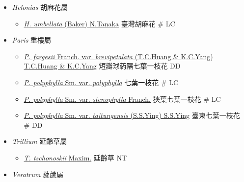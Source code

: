 
  \begin{itemize}
 \item[] \textit{Helonias} 胡麻花屬
                                
  \begin{itemize}
        \item[] \href{http://www.theplantlist.org/tpl1.1/search?q=Helonias+umbellata}{\textit{H. umbellata} (Baker) N.Tanaka}   臺灣胡麻花  \# LC
  \end{itemize}
 \item[] \textit{Paris} 重樓屬
                                
  \begin{itemize}
        \item[] \href{http://www.theplantlist.org/tpl1.1/search?q=Paris+fargesii+var.+brevipetalata}{\textit{P. fargesii} Franch. var. \textit{brevipetalata} (T.C.Huang \& K.C.Yang) T.C.Huang \& K.C.Yang}   短瓣球葯隔七葉一枝花   DD
        \item[] \href{http://www.theplantlist.org/tpl1.1/search?q=Paris+polyphylla+var.+polyphylla}{\textit{P. polyphylla} Sm. var. \textit{polyphylla}}   七葉一枝花  \# LC
        \item[] \href{http://www.theplantlist.org/tpl1.1/search?q=Paris+polyphylla+var.+stenophylla}{\textit{P. polyphylla} Sm. var. \textit{stenophylla} Franch.}   狹葉七葉一枝花  \# LC
        \item[] \href{http://www.theplantlist.org/tpl1.1/search?q=Paris+polyphylla+var.+taitungensis}{\textit{P. polyphylla} Sm. var. \textit{taitungensis} (S.S.Ying) S.S.Ying}   臺東七葉一枝花  \# DD
  \end{itemize}
 \item[] \textit{Trillium} 延齡草屬
                                
  \begin{itemize}
        \item[] \href{http://www.theplantlist.org/tpl1.1/search?q=Trillium+tschonoskii}{\textit{T. tschonoskii} Maxim.}   延齡草   NT
  \end{itemize}
 \item[] \textit{Veratrum} 藜蘆屬
                                

\end{itemize}
